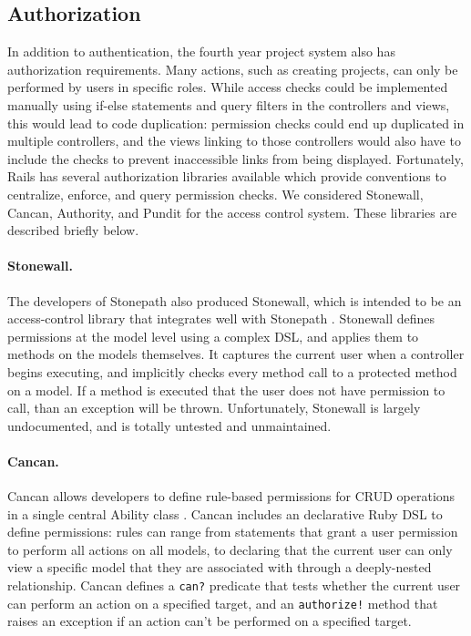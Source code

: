 \documentclass[document.tex]{subfiles}
\begin{document}
\FloatBarrier

\subsection{Authorization}

In addition to authentication, the fourth year project system also has authorization requirements. Many actions, such as creating projects, can only be performed by users in specific roles. While access checks could be implemented manually using if-else statements and query filters in the controllers and views, this would lead to code duplication: permission checks could end up duplicated in multiple controllers, and the views linking to those controllers would also have to include the checks to prevent inaccessible links from being displayed. Fortunately, Rails has several authorization libraries available which provide conventions to centralize, enforce, and query permission checks. We considered Stonewall, Cancan, Authority, and Pundit for the access control system. These libraries are described briefly below.

\paragraph{Stonewall.} The developers of Stonepath also produced Stonewall, which is intended to be an access-control library that integrates well with Stonepath \cite{stonewall}. Stonewall defines permissions at the model level using a complex DSL, and applies them to methods on the models themselves. It captures the current user when a controller begins executing, and implicitly checks every method call to a protected method on a model. If a method is executed that the user does not have permission to call, than an exception will be thrown. Unfortunately, Stonewall is largely undocumented, and is totally untested and unmaintained.

\paragraph{Cancan.} Cancan allows developers to define rule-based permissions for CRUD operations in a single central Ability class \cite{cancan}. Cancan includes an declarative Ruby DSL to define permissions: rules can range from statements that grant a user permission to perform all actions on all models, to declaring that the current user can only view a specific model that they are associated with through a deeply-nested relationship. Cancan defines a \verb!can?! predicate that tests whether the current user can perform an action on a specified target, and an \verb|authorize!| method that raises an exception if an action can’t be performed on a specified target.
\end{document}
